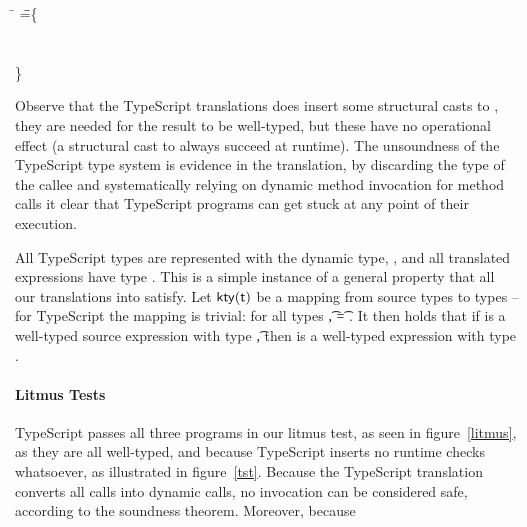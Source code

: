 \documentclass[acmsmall, anonymous, authordraft, review]{acmart} %
\begin{document}
\medskip
{\small
\begin{tabbing}
  \hspace{.2cm}
   \= \DynCall{(\SubCast\any{\New\C{}})}\m{\DynCall{(\SubCast\any{\New\C{}})}\n{\New\C{}}} \HS\HS\HS\WHERE\HS \K\HS =\HS\= \class\= \C \{\\
   \>              \>\HS \Mdef\m\x\any\any{~\SubCast\any\this~} \\
   \>              \>\HS  \Mdef\mp\x\any\any{~\x~}\\
   \>                                                              \>  \}   
\end{tabbing}}
\medskip

\noindent
Observe that the TypeScript translations does insert some structural casts
to \any, they are needed for the result to be well-typed, but these have no
operational effect (a structural cast to \any always succeed at runtime).
The unsoundness of the TypeScript type system is evidence in the
translation, by discarding the type of the callee and systematically relying
on dynamic method invocation for method calls it clear that TypeScript
programs can get stuck at any point of their execution.


All TypeScript types are represented with the dynamic \kafka type, \any, and
all translated expressions have type \any.  This is a simple instance of a
general property that all our translations into \kafka satisfy.  Let
\(\kty\t\) be a mapping from source types to \kafka types -- for TypeScript
the mapping is trivial: for all types \t, \kty\t = \src{\any}.  It then
holds that if \e is a well-typed source expression with type \t, then
\TR{\e} is a well-typed \kafka expression with type \kty{\t}. 


\paragraph{Litmus Tests}

TypeScript passes all three programs in our litmus test, as seen in
figure~\ref{litmus}, as they are all well-typed, and because TypeScript
inserts no runtime checks whatsoever, as illustrated in figure~\ref{tst}.
Because the TypeScript translation converts all calls into dynamic calls,
no invocation can be considered safe, according to the \kafka soundness 
theorem. Moreover, because 

% 
% 
\end{document}
